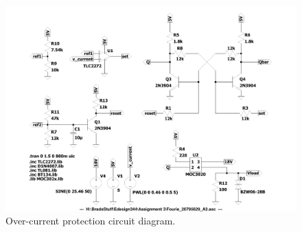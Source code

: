\begin{figure}[!ht]
  \centering
 \footnotesize
        \includegraphics[width=0.75\linewidth]{./Figures/circuit_diagram_switch.pdf}
		    \caption{Over-current protection circuit diagram.} \label{fig:circuit_diagram_switch}
 \end{figure}

